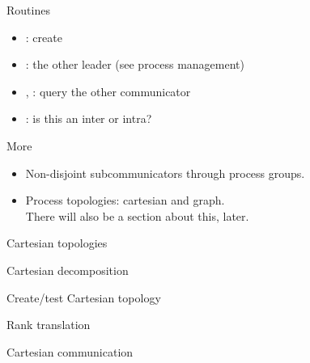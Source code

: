 \begin{numberedframe}{Routines}
  \label{sl:intercomm-routines}
  \begin{itemize}
  \item
    : create
  \item {}: the other leader (see process management)
  \item {}, :
    query the other communicator
  \item {}: is this an inter or intra?
  \end{itemize}
\end{numberedframe}

\begin{numberedframe}{More}
  \begin{itemize}
  \item Non-disjoint subcommunicators through process groups.
  \item Process topologies: cartesian and graph.\\
    There will also be a section about this, later.
  \end{itemize}
\end{numberedframe}

 {Cartesian topologies}

\begin{numberedframe}{Cartesian decomposition}
\end{numberedframe}

\begin{numberedframe}{Create/test Cartesian topology}

\end{numberedframe}

\begin{comment}
  \begin{numberedframe}{Topology testing}
    \cverbatimsnippet{carttypetest}  
  \end{numberedframe}
\end{comment}

\begin{numberedframe}{Rank translation}
\end{numberedframe}

\begin{numberedframe}{Cartesian communication}
  \footnotesize
\end{numberedframe}

